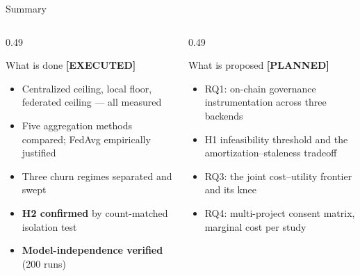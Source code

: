 \documentclass[aspectratio=169, 11pt]{beamer}
\newcommand{\planned}{{\color{mGray}\textbf{[PLANNED]}}}
\newcommand{\donelight}{{\color{white}\textbf{[EXECUTED]}}}
\begin{document}
\begin{frame}{Summary}
\begin{columns}[T]
\begin{column}{0.49\textwidth}
\begin{exampleblock}{What is done \donelight}
\begin{itemize}\small
\item Centralized ceiling, local floor, federated ceiling --- all measured
\item Five aggregation methods compared; FedAvg empirically justified
\item Three churn regimes separated and swept
\item \textbf{H2 confirmed} by count-matched isolation test
\item \textbf{Model-independence verified} (200 runs)
\end{itemize}
\end{exampleblock}
\end{column}
\begin{column}{0.49\textwidth}
\begin{block}{What is proposed \planned}
\begin{itemize}\small
\item RQ1: on-chain governance instrumentation across three backends
\item H1 infeasibility threshold and the amortization--staleness tradeoff
\item RQ3: the joint cost--utility frontier and its knee
\item RQ4: multi-project consent matrix, marginal cost per study
\end{itemize}
\end{block}
\end{column}
\end{columns}
\vspace{0.6em}
\begin{center}
\end{center}
\end{frame}
\end{document}
